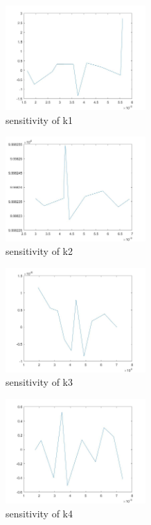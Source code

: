 \begin{figure}[H]
	\centering
	\begin{subfigure}{0.5\textwidth}
		\includegraphics[height=4cm]{s1.jpg}
		\caption{sensitivity of k1}
	\end{subfigure}
	\begin{subfigure}{0.5\textwidth}
		\includegraphics[height=4cm]{s2.jpg}
		\caption{sensitivity of k2}
	\end{subfigure}
	\begin{subfigure}{0.5\textwidth}
		\includegraphics[height=4cm]{s3.jpg}
		\caption{sensitivity of k3}
	\end{subfigure}%
	\begin{subfigure}{0.5\textwidth}
		\includegraphics[height=4cm]{s4.jpg}
		\caption{sensitivity of k4}
	\end{subfigure}
	\begin{subfigure}{0.5\textwidth}

\end{subfigure}
\end{figure}
